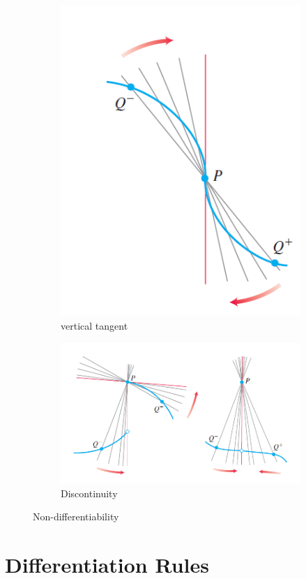 \documentclass[12pt]{article}
\begin{document}
\begin{figure}[h!]
\begin{subfigure}{0.3\linewidth}
        \includegraphics[width = 0.8\linewidth]{Images/vertical tangent.png}
        \caption{vertical tangent}
    \end{subfigure}
    \begin{subfigure}{0.6\linewidth}
        \includegraphics[width = 0.8\linewidth]{Images/discontinue.png}
        \caption{Discontinuity}
    \end{subfigure}
    \caption{Non-differentiability}
\end{figure}

\section{Differentiation Rules}
\end{document}
